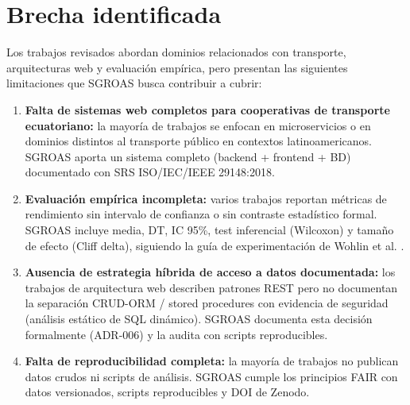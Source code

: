 \section{Brecha identificada}
\label{sec:brecha}

Los trabajos revisados abordan dominios relacionados con transporte, arquitecturas web y evaluación empírica, pero presentan las siguientes limitaciones que SGROAS busca contribuir a cubrir:

\begin{enumerate}
  \item \textbf{Falta de sistemas web completos para cooperativas de transporte ecuatoriano:} la mayoría de trabajos se enfocan en microservicios \cite{alshuqayran2016,soldani2018,taibi2018,waseem2021} o en dominios distintos al transporte público en contextos latinoamericanos. SGROAS aporta un sistema completo (backend + frontend + BD) documentado con SRS ISO/IEC/IEEE 29148:2018.

  \item \textbf{Evaluación empírica incompleta:} varios trabajos reportan métricas de rendimiento sin intervalo de confianza \cite{jiang2009} o sin contraste estadístico formal. SGROAS incluye media, DT, IC 95\%, test inferencial (Wilcoxon) y tamaño de efecto (Cliff delta), siguiendo la guía de experimentación de Wohlin et al. \cite{wohlin2012}.

  \item \textbf{Ausencia de estrategia híbrida de acceso a datos documentada:} los trabajos de arquitectura web \cite{pautasso2008,fielding2002} describen patrones REST pero no documentan la separación CRUD-ORM / stored procedures con evidencia de seguridad (análisis estático de SQL dinámico). SGROAS documenta esta decisión formalmente (ADR-006) y la audita con scripts reproducibles.

  \item \textbf{Falta de reproducibilidad completa:} la mayoría de trabajos no publican datos crudos ni scripts de análisis. SGROAS cumple los principios FAIR \cite{wilkinson2016} con datos versionados, scripts reproducibles y DOI de Zenodo.
\end{enumerate}
